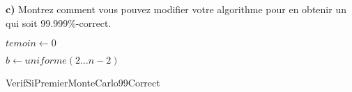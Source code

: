 \documentclass[devoir4.tex]{subfiles}
\begin{document}
\newpage

\textbf{c)} Montrez comment vous pouvez modifier votre algorithme pour en obtenir un qui soit 99.999\%-correct.

\vspace{0.2cm}

\begin{algorithm}[H]
   
    \(temoin \gets 0 \) 
   
    \vspace{0.2cm}
    {
		\(b \gets uniforme(2 \dots n-2) \)
	
	}
	 
	
      \caption{VerifSiPremierMonteCarlo99Correct} 
\end{algorithm}
\end{document}
